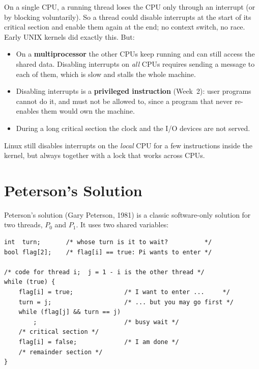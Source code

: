 \documentclass[11pt,a4paper]{article}
\begin{document}
On a single CPU, a running thread loses the CPU only through an interrupt (or by blocking voluntarily). So a thread could disable interrupts at the start of its critical section and enable them again at the end; no context switch, no race. Early UNIX kernels did exactly this. But:
\begin{itemize}
  \item On a \textbf{multiprocessor} the other CPUs keep running and can still access the shared data. Disabling interrupts on \emph{all} CPUs requires sending a message to each of them, which is slow and stalls the whole machine.
  \item Disabling interrupts is a \textbf{privileged instruction} (Week~2): user programs cannot do it, and must not be allowed to, since a program that never re-enables them would own the machine.
  \item During a long critical section the clock and the I/O devices are not served.
\end{itemize}
Linux still disables interrupts on the \emph{local} CPU for a few instructions inside the kernel, but always together with a lock that works across CPUs.

\section{Peterson's Solution}

Peterson's solution (Gary Peterson, 1981) is a classic software-only solution for two threads, $P_0$ and $P_1$. It uses two shared variables:
\begin{lstlisting}
int  turn;       /* whose turn is it to wait?          */
bool flag[2];    /* flag[i] == true: Pi wants to enter */

/* code for thread i;  j = 1 - i is the other thread */
while (true) {
    flag[i] = true;              /* I want to enter ...     */
    turn = j;                    /* ... but you may go first */
    while (flag[j] && turn == j)
        ;                        /* busy wait */
    /* critical section */
    flag[i] = false;             /* I am done */
    /* remainder section */
}
\end{lstlisting}
\end{document}
